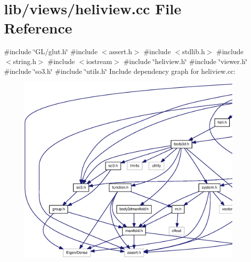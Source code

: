 \section{lib/views/heliview.cc \-File \-Reference}
\label{heliview_8cc}
{\ttfamily \#include \char`\"{}\-G\-L/glut.\-h\char`\"{}}\*
{\ttfamily \#include $<$assert.\-h$>$}\*
{\ttfamily \#include $<$stdlib.\-h$>$}\*
{\ttfamily \#include $<$string.\-h$>$}\*
{\ttfamily \#include $<$iostream$>$}\*
{\ttfamily \#include \char`\"{}heliview.\-h\char`\"{}}\*
{\ttfamily \#include \char`\"{}viewer.\-h\char`\"{}}\*
{\ttfamily \#include \char`\"{}so3.\-h\char`\"{}}\*
{\ttfamily \#include \char`\"{}utils.\-h\char`\"{}}\*
\-Include dependency graph for heliview.\-cc\-:\nopagebreak
\begin{figure}[H]
\begin{center}
\leavevmode
\includegraphics[width=350pt]{heliview_8cc__incl}
\end{center}
\end{figure}
